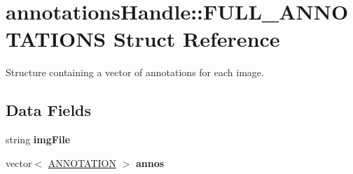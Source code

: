\hypertarget{structannotationsHandle_1_1FULL__ANNOTATIONS}{
\section{annotationsHandle::FULL\_\-ANNOTATIONS Struct Reference}
\label{structannotationsHandle_1_1FULL__ANNOTATIONS}
}


Structure containing a vector of annotations for each image.  


\subsection*{Data Fields}
\begin{DoxyCompactItemize}
\item 
\hypertarget{structannotationsHandle_1_1FULL__ANNOTATIONS_a44fc1b9d87a11e92f5b99478c4c70de0}{
string {\bfseries imgFile}}
\label{structannotationsHandle_1_1FULL__ANNOTATIONS_a44fc1b9d87a11e92f5b99478c4c70de0}

\item 
\hypertarget{structannotationsHandle_1_1FULL__ANNOTATIONS_a929ca2abe531b87f0f78d96798c21868}{
vector$<$ \hyperlink{structannotationsHandle_1_1ANNOTATION}{ANNOTATION} $>$ {\bfseries annos}}
\label{structannotationsHandle_1_1FULL__ANNOTATIONS_a929ca2abe531b87f0f78d96798c21868}

\end{DoxyCompactItemize}
